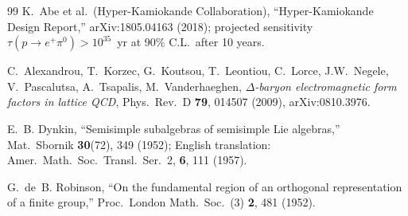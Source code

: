 \documentclass[aps,prd,twocolumn,superscriptaddress,floatfix,nofootinbib]{revtex4-2}
\theoremstyle{definition}
\theoremstyle{remark}
\begin{document}
\begin{thebibliography}{99}
 K.~Abe et al.\ (Hyper-Kamiokande Collaboration), ``Hyper-Kamiokande
Design Report,'' arXiv:1805.04163 (2018); projected sensitivity
$\tau(p \to e^+\pi^0) > 10^{35}$~yr at 90\% C.L.\ after 10 years.

 C.~Alexandrou, T.~Korzec, G.~Koutsou, T.~Leontiou, C.~Lorce, J.W.~Negele, V.~Pascalutsa, A.~Tsapalis, M.~Vanderhaeghen, \emph{$\Delta$-baryon electromagnetic form factors in lattice QCD}, Phys.\ Rev.\ D \textbf{79}, 014507 (2009), arXiv:0810.3976.

 E.~B. Dynkin, ``Semisimple subalgebras of semisimple Lie algebras,'' Mat.\ Sbornik \textbf{30}(72), 349 (1952); English translation: Amer.\ Math.\ Soc.\ Transl.\ Ser.~2, \textbf{6}, 111 (1957).

 G.~de~B. Robinson, ``On the fundamental region of an orthogonal representation of a finite group,'' Proc.\ London Math.\ Soc.\ (3) \textbf{2}, 481 (1952).

\end{thebibliography}
\end{document}
